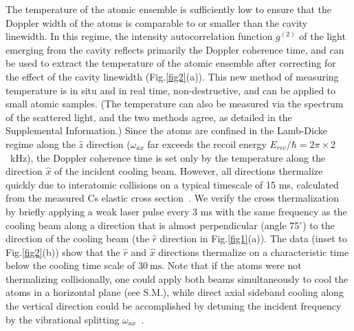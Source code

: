 \documentclass[aps,prl,superscriptaddress,onecloumn,nobibnotes]{revtex4-1}
\begin{document}
 The temperature of the atomic ensemble is sufficiently low to ensure that the Doppler width of the atoms is comparable to or smaller than the cavity linewidth. In this regime, the intensity autocorrelation function $g^{(2)}$ of the light emerging from the cavity reflects primarily the Doppler coherence time, and can be used to extract the temperature of the atomic ensemble after correcting for the effect of the cavity linewidth (Fig.\ref{fig2}(a)). This new method of measuring temperature is in situ and in real time, non-destructive, and can be applied to small atomic samples. (The temperature can also be measured via the spectrum of the scattered light, and the two methods agree, as detailed in the Supplemental Information.) Since the atoms are confined in the Lamb-Dicke regime along the $\hat{z}$ direction ($\omega_{ax}$ far exceeds the recoil energy $E_{rec}/\hbar=2\pi \times 2$~kHz), the Doppler coherence time is set only by the temperature along the direction $\hat{x}$ of the incident cooling beam. However, all directions thermalize quickly due to interatomic collisions on a typical timescale of 15 ms, calculated from the measured Cs elastic cross section~\cite{Chin:PRL2000}.   We verify the cross thermalization by briefly applying a weak laser pulse every 3 ms with the same frequency as the cooling beam along a direction that is almost perpendicular (angle 75$^\circ$) to the direction of the cooling beam (the $\hat{r}$ direction in Fig.\ref{fig1}(a)). The data (inset to Fig.\ref{fig2}(b)) show that the $\hat{r}$ and $\hat{x}$ directions thermalize on a characteristic time below the cooling time scale of $30~\mathrm{ms}$. Note that if the atoms were not thermalizing collisionally, one could apply both beams simultaneously to cool the atoms in a horizontal plane (see S.M.), while direct axial sideband cooling along the vertical direction could be accomplished by detuning the incident frequency by the vibrational splitting $\omega_{ax}$~\cite{VV:pra2001}. \par
\end{document}
